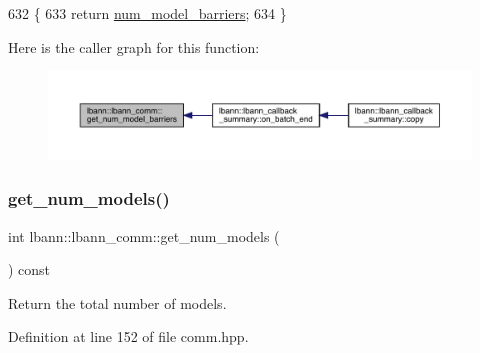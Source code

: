 \begin{DoxyCode}
632                                                \{
633     \textcolor{keywordflow}{return} \hyperlink{classlbann_1_1lbann__comm_aa4f15459eca2a06174a877ba0c23feb7}{num\_model\_barriers};
634   \}
\end{DoxyCode}
Here is the caller graph for this function\+:\nopagebreak
\begin{figure}[H]
\begin{center}
\leavevmode
\includegraphics[width=350pt]{classlbann_1_1lbann__comm_ab07201c12c01f065acb151f2a3c32efa_icgraph}
\end{center}
\end{figure}
\mbox{\label{classlbann_1_1lbann__comm_aeb8ef8f13bbb324e3e1f656998198f3f}} 
\subsubsection{\texorpdfstring{get\+\_\+num\+\_\+models()}{get\_num\_models()}}
{\footnotesize\ttfamily int lbann\+::lbann\+\_\+comm\+::get\+\_\+num\+\_\+models (\begin{DoxyParamCaption}{ }\end{DoxyParamCaption}) const\hspace{0.3cm}{\ttfamily [inline]}}

Return the total number of models. 

Definition at line 152 of file comm.\+hpp.


